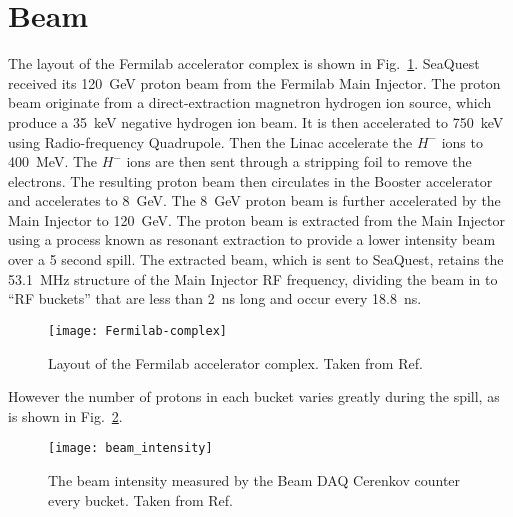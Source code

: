 \documentclass[../main.tex]{subfiles}
\begin{document}
\section{Beam}
The layout of the Fermilab accelerator complex is shown in Fig.~\ref{fig:complex}.
SeaQuest received its \SI{120}{\GeV} proton beam from the Fermilab Main Injector.
The proton beam originate from a direct-extraction magnetron hydrogen ion source,
which produce a \SI{35}{\keV} negative hydrogen ion beam. It is then accelerated
to \SI{750}{\keV} using Radio-frequency Quadrupole. Then the Linac accelerate the
$H^-$ ions to \SI{400}{\MeV}. The $H^-$ ions are then sent through a stripping foil
to remove the electrons. The resulting proton beam then circulates in the Booster
accelerator and accelerates to \SI{8}{\GeV}. The \SI{8}{\GeV} proton beam is
further accelerated by the Main Injector to \SI{120}{\GeV}. The proton beam is
extracted from the Main Injector using a process known as resonant extraction to
provide a lower intensity beam over a 5 second spill. The extracted beam, which
is sent to SeaQuest, retains the \SI{53.1}{\MHz} structure of the Main
Injector RF frequency, dividing the beam in to ``RF buckets'' that are less than
\SI{2}{\ns} long and occur every \SI{18.8}{\ns}.
\begin{figure}[htbp!]
	\centering
	\texttt{[image: Fermilab-complex]}
	\caption{Layout of the Fermilab accelerator complex. Taken from Ref.~\cite{concept-book}}
	\label{fig:complex}
\end{figure}
However the number of protons in each bucket varies greatly during the spill, as
is shown in Fig.~\ref{fig:intensity}.
\begin{figure}[htpb!]
	\centering
	\texttt{[image: beam\_intensity]}
	\caption{The beam intensity measured by the Beam DAQ Cerenkov counter every
		bucket. Taken from Ref.~\cite{aidala2019}}
	\label{fig:intensity}
\end{figure}
\end{document}
